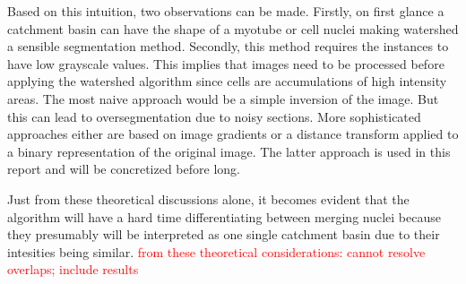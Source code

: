 Based on this intuition, two observations can be made. Firstly, on first glance a catchment basin can have the shape of a myotube or cell nuclei making watershed a sensible segmentation method. Secondly, this method requires the instances to have low grayscale values. This implies that images need to be processed before applying the watershed algorithm since cells are accumulations of high intensity areas. The most naive approach would be a simple inversion of the image. But this can lead to oversegmentation due to noisy sections. More sophisticated approaches either are based on image gradients or a distance transform applied to a binary representation of the original image. The latter approach is used in this report and will be concretized before long.

Just from these theoretical discussions alone, it becomes evident that the algorithm will have a hard time differentiating between merging nuclei because they presumably will be interpreted as one single catchment basin due to their intesities being similar. 
\textcolor{red}{from these theoretical considerations: cannot resolve overlaps;}
\textcolor{red}{include results}


